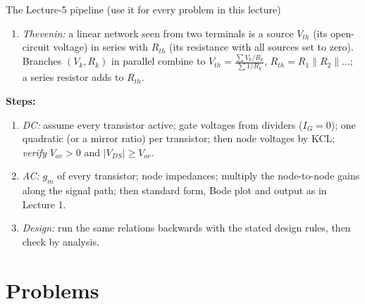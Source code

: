 \documentclass[11pt]{article}
\begin{document}
\begin{cardbox}{The Lecture-5 pipeline (use it for every problem in this lecture)}
\begin{enumerate}[label=\textbf{T\arabic*},leftmargin=2.2em,itemsep=1pt]
\item \emph{Thevenin:} a linear network seen from two terminals is a source $V_{th}$ (its open-circuit voltage) in
      series with $R_{th}$ (its resistance with all sources set to zero). Branches $(V_k, R_k)$ in parallel combine to
      $V_{th} = \frac{\sum V_k/R_k}{\sum 1/R_k}$, $R_{th} = R_1\|R_2\|\dots$; a series resistor adds to $R_{th}$.
\end{enumerate}
\textbf{Steps:}
\begin{enumerate}[leftmargin=2.2em,itemsep=1pt]
\item \emph{DC:} assume every transistor active; gate voltages from dividers ($I_G=0$); one quadratic (or a mirror
      ratio) per transistor; then node voltages by KCL; \emph{verify} $V_{ov} > 0$ and $|V_{DS}| \ge V_{ov}$.
\item \emph{AC:} $g_m$ of every transistor; node impedances; multiply the node-to-node gains along the signal path;
      then standard form, Bode plot and output as in Lecture 1.
\item \emph{Design:} run the same relations backwards with the stated design rules, then check by analysis.
\end{enumerate}
\end{cardbox}

\section*{Problems}
\end{document}
